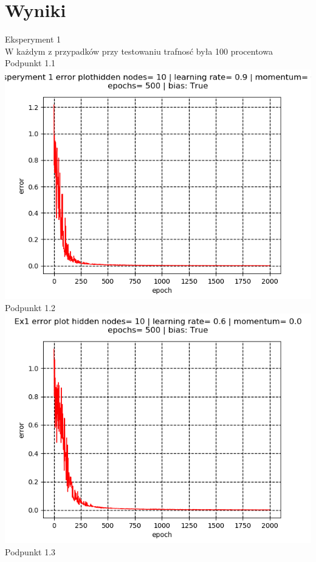 \documentclass{classrep}
\begin{document}
\section{Wyniki}
{Eksperyment 1\\
W każdym z przypadków przy testowaniu trafnosć była 100 procentowa\\
Podpunkt 1.1\\
\includegraphics{imgs/11.png}\\
Podpunkt 1.2\\
\includegraphics{imgs/12.png}\\
Podpunkt 1.3\\
}
\end{document}
